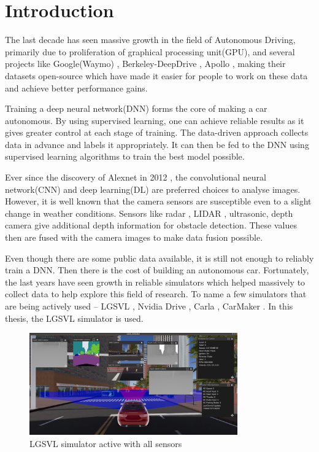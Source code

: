 \chapter{Introduction}

The last decade has seen massive growth in the field of Autonomous
Driving, primarily due to proliferation of graphical processing unit(GPU), and several projects like Google(Waymo) \cite{Waymo},
Berkeley-DeepDrive \cite{Berkeley-DeepDrive}, Apollo \cite{Apollo}, making their datasets
open-source which have made it easier for people to work on these data and achieve better performance gains.



Training a deep neural network(DNN) forms the core of making a car autonomous.
By using supervised learning, one can achieve reliable results as it gives greater control
at each stage of training. The data-driven approach collects data in advance and labels it
appropriately. It can then be fed to the DNN using supervised
learning algorithms to train the best model possible.

Ever since the discovery of Alexnet in 2012 \cite{Alexnet2012}, the convolutional neural network(CNN) and
deep learning(DL) are preferred choices to analyse images.  However, it is well known that the camera sensors are susceptible even to a slight change in weather conditions.
Sensors like radar \cite{Radar}, LIDAR \cite{LIDAR}, ultrasonic\cite{ultrasonic}, depth camera
give additional depth information for obstacle detection. These values then are fused with the camera images to make
data fusion possible.

Even though there are some public data available, it is still not enough to reliably
train a DNN. Then there is  the cost of building an autonomous car. Fortunately, the last
years have seen growth in reliable simulators which
helped massively to collect data to help explore this field of research.
To name a few simulators that are being actively used -- LGSVL \cite{rong2020lgsvl}, Nvidia Drive
\cite{NvidiaSimulator}, Carla \cite{CarlaSimulator}, CarMaker \cite{CarMaker}.
In this thesis, the LGSVL simulator is used.

\begin{figure}[h]
    \begin{center}
        \includegraphics[width = 0.8\textwidth]{figures/png/intro/LGSVL_2_scrot_2020-08-26_20-46-55.png}
    \end{center}
    \caption{LGSVL\cite{rong2020lgsvl} simulator active with all sensors}
        \label{fig:LGSVL_constellation_sensors}
\end{figure}

